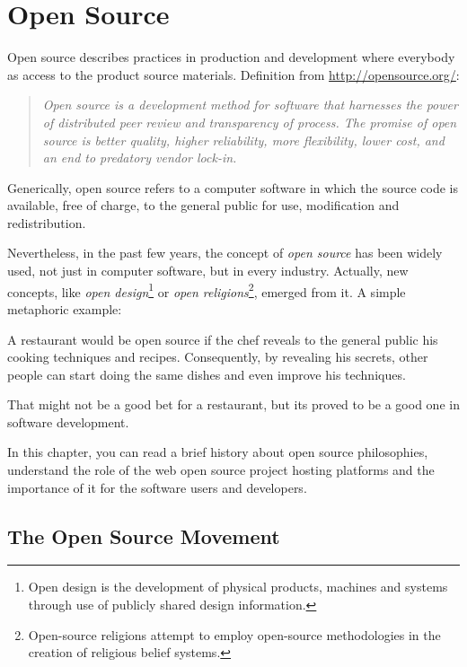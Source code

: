\thispagestyle{empty}
\chapter{Open Source}\label{chap:open_source}


 
Open source describes practices in production and development where everybody as access to the product source materials.
Definition from \url{http://opensource.org/}:
\begin{quote}\emph{
  Open source is a development method for software that harnesses the power of distributed peer review and transparency of process.
  The promise of open source is better quality, higher reliability, more flexibility, lower cost, 
  and an end to predatory vendor lock-in.
}\end{quote}

Generically, open source refers to a computer software in which the source code is available, free of charge, to the general public for use, modification and redistribution.

Nevertheless, in the past few years, the concept of \emph{open source} 
has been widely used, not just in computer software, but in every industry.
Actually, new concepts, like 
\emph{open design}\footnote{
  Open design is the development of physical products, machines and systems through use of publicly shared design information.
} or 
\emph{open religions}\footnote{
  Open-source religions attempt to employ open-source methodologies in the creation of religious belief systems.
},
emerged from it.
A simple metaphoric example: 

A restaurant would be open source if the chef reveals to the general public his cooking techniques and recipes.
Consequently, by revealing his secrets, other people can start doing the same dishes and even improve his techniques.

That might not be a good bet for a restaurant, but its proved to be a good one in software development.

In this chapter, you can read a brief history about open source philosophies, 
understand the role of the web open source project hosting platforms
and the importance of it for the software users and developers.


\section{The Open Source Movement}

